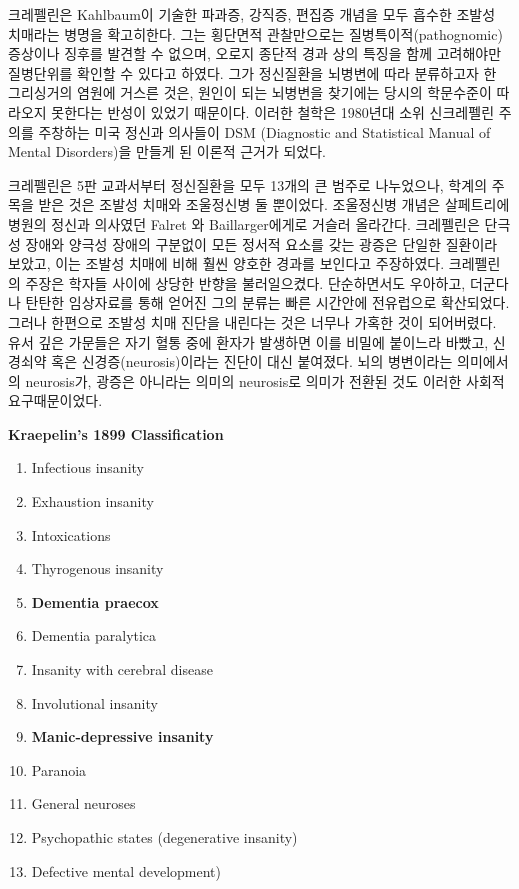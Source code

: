 \documentclass[
]{article}
\begin{document}
크레펠린은 Kahlbaum이 기술한 파과증, 강직증, 편집증 개념을 모두 흡수한
조발성 치매라는 병명을 확고히한다. 그는 횡단면적 관찰만으로는
질병특이적(pathognomic) 증상이나 징후를 발견할 수 없으며, 오로지 종단적
경과 상의 특징을 함께 고려해야만 질병단위를 확인할 수 있다고 하였다.
그가 정신질환을 뇌병변에 따라 분류하고자 한 그리싱거의 염원에 거스른
것은, 원인이 되는 뇌병변을 찾기에는 당시의 학문수준이 따라오지 못한다는
반성이 있었기 때문이다. 이러한 철학은 1980년대 소위 신크레펠린 주의를
주창하는 미국 정신과 의사들이 DSM (Diagnostic and Statistical Manual of
Mental Disorders)을 만들게 된 이론적 근거가 되었다.

크레펠린은 5판 교과서부터 정신질환을 모두 13개의 큰 범주로 나누었으나,
학계의 주목을 받은 것은 조발성 치매와 조울정신병 둘 뿐이었다. 조울정신병
개념은 살페트리에 병원의 정신과 의사였던 Falret 와 Baillarger에게로
거슬러 올라간다. 크레펠린은 단극성 장애와 양극성 장애의 구분없이 모든
정서적 요소를 갖는 광증은 단일한 질환이라 보았고, 이는 조발성 치매에
비해 훨씬 양호한 경과를 보인다고 주장하였다. 크레펠린의 주장은 학자들
사이에 상당한 반향을 불러일으켰다. 단순하면서도 우아하고, 더군다나
탄탄한 임상자료를 통해 얻어진 그의 분류는 빠른 시간안에 전유럽으로
확산되었다. 그러나 한편으로 조발성 치매 진단을 내린다는 것은 너무나
가혹한 것이 되어버렸다. 유서 깊은 가문들은 자기 혈통 중에 환자가
발생하면 이를 비밀에 붙이느라 바빴고, 신경쇠약 혹은
신경증(neurosis)이라는 진단이 대신 붙여졌다. 뇌의 병변이라는 의미에서의
neurosis가, 광증은 아니라는 의미의 neurosis로 의미가 전환된 것도 이러한
사회적 요구때문이었다.

\textbf{Kraepelin's 1899 Classification}

\begin{enumerate}
\def\labelenumi{\arabic{enumi}.}
\item
  Infectious insanity
\item
  Exhaustion insanity
\item
  Intoxications
\item
  Thyrogenous insanity
\item
  \textbf{Dementia praecox}
\item
  Dementia paralytica
\item
  Insanity with cerebral disease
\item
  Involutional insanity
\item
  \textbf{Manic-depressive insanity}
\item
  Paranoia
\item
  General neuroses
\item
  Psychopathic states (degenerative insanity)
\item
  Defective mental development)
\end{enumerate}
\end{document}
